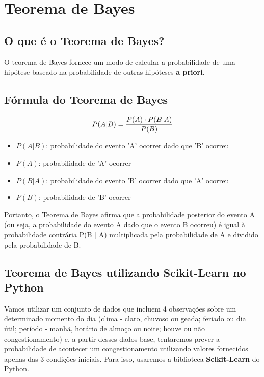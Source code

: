 \section{Teorema de Bayes}

\subsection{O que é o Teorema de Bayes?}

O teorema de Bayes fornece um modo de calcular a probabilidade de uma hipótese baseado na probabilidade de outras hipóteses \textbf{a priori}.

\subsection{Fórmula do Teorema de Bayes}

\[ \large P(A|B) = \frac{P(A) \cdot P(B|A)}{P(B)}\]

\begin{itemize}
\item $P(A|B)$: probabilidade do evento 'A' ocorrer dado que 'B' ocorreu
\item $P(A)$: probabilidade de 'A' ocorrer
\item $P(B|A)$: probabilidade do evento 'B' ocorrer dado que 'A' ocorreu
\item $P(B)$: probabilidade de 'B' ocorrer
\end{itemize}

Portanto, o Teorema de Bayes afirma que a probabilidade posterior do evento A (ou seja, a probabilidade do evento A dado que o evento B ocorreu) é igual à probabilidade contrária P(B \(|\) A) multiplicada pela probabilidade de A e dividido pela probabilidade de B.

\subsection{Teorema de Bayes utilizando Scikit-Learn no Python}

Vamos utilizar um conjunto de dados que incluem 4 observações sobre um determinado momento do dia (clima - claro, chuvoso ou geada; feriado ou dia útil; período - manhã, horário de almoço ou noite; houve ou não congestionamento) e, a partir desses dados base, tentaremos prever a probabilidade de acontecer um congestionamento utilizando valores fornecidos apenas das 3 condições iniciais. Para isso, usaremos a biblioteca \textbf{Scikit-Learn} do Python.

